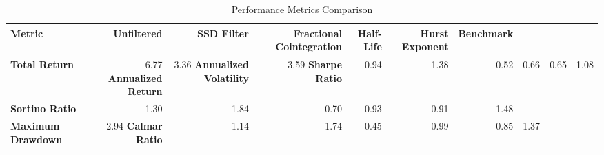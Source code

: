 \begin{table}[ht]
\centering[ht]
\caption{Performance Metrics Comparison}
\label{tab:performance_metrics}
\begin{tabular}{lrrrrrr}
\toprule
\textbf{Metric}
 & Unfiltered & SSD Filter & Fractional Cointegration & Half-Life & Hurst Exponent & Benchmark \\
\midrule
\textbf{Total Return} & 6.77%
\textbf{Annualized Return} & 3.36%
\textbf{Annualized Volatility} & 3.59%
\textbf{Sharpe Ratio} & 0.94 & 1.38 & 0.52 & 0.66 & 0.65 & 1.08 \\
\textbf{Sortino Ratio} & 1.30 & 1.84 & 0.70 & 0.93 & 0.91 & 1.48 \\
\textbf{Maximum Drawdown} & -2.94%
\textbf{Calmar Ratio} & 1.14 & 1.74 & 0.45 & 0.99 & 0.85 & 1.37 \\
\bottomrule
\end{tabular}
\end{table}
